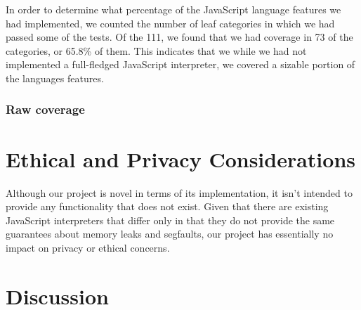 \documentclass{article}
\begin{document}
In order to determine what percentage of the JavaScript language features we had
implemented, we counted the number of leaf categories in which we had passed
some of the tests. Of the 111, we found that we had coverage in 73 of the
categories, or 65.8\% of them. This indicates that we while we had not
implemented a full-fledged JavaScript interpreter, we covered a sizable portion
of the languages features.

\subsubsection*{Raw coverage}

\section*{Ethical and Privacy Considerations}

Although our project is novel in terms of its implementation, it isn't intended
to provide any functionality that does not exist. Given that there are existing
JavaScript interpreters that differ only in that they do not provide the same
guarantees about memory leaks and segfaults, our project has essentially no
impact on privacy or ethical concerns.

\section*{Discussion}
\end{document}
